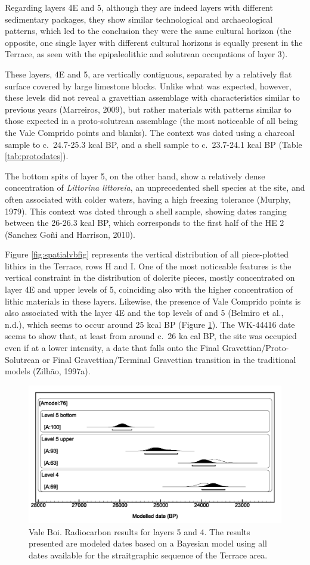 \documentclass[12pt,twoside]{reedthesis}
\begin{document}
Regarding layers 4E and 5, although they are indeed layers with different sedimentary packages, they show similar technological and archaeological patterns, which led to the conclusion they were the same cultural horizon (the opposite, one single layer with different cultural horizons is equally present in the Terrace, as seen with the epipaleolithic and solutrean occupations of layer 3).

These layers, 4E and 5, are vertically contiguous, separated by a relatively flat surface covered by large limestone blocks. Unlike what was expected, however, these levels did not reveal a gravettian assemblage with characteristics similar to previous years (Marreiros, 2009), but rather materials with patterns similar to those expected in a proto-solutrean assemblage (the most noticeable of all being the Vale Comprido points and blanks). The context was dated using a charcoal sample to c.~24.7-25.3 kcal BP, and a shell sample to c.~23.7-24.1 kcal BP (Table \ref{tab:protodates}).

The bottom spits of layer 5, on the other hand, show a relatively dense concentration of \emph{Littorina littoreia}, an unprecedented shell species at the site, and often associated with colder waters, having a high freezing tolerance (Murphy, 1979). This context was dated through a shell sample, showing dates ranging between the 26-26.3 kcal BP, which corresponds to the first half of the HE 2 (Sanchez Goñi and Harrison, 2010).

Figure \ref{fig:spatialvbfig} represents the vertical distribution of all piece-plotted lithics in the Terrace, rows H and I. One of the most noticeable features is the vertical constraint in the distribution of dolerite pieces, mostly concentrated on layer 4E and upper levels of 5, coinciding also with the higher concentration of lithic materials in these layers. Likewise, the presence of Vale Comprido points is also associated with the layer 4E and the top levels of and 5 (Belmiro et al., n.d.), which seems to occur around 25 kcal BP (Figure \ref{fig:c14VB}). The WK-44416 date seems to show that, at least from around c.~26 ka cal BP, the site was occupied even if at a lower intensity, a date that falls onto the Final Gravettian/Proto-Solutrean or Final Gravettian/Terminal Gravettian transition in the traditional models (Zilhão, 1997a).
\begin{figure}

{\centering \includegraphics[width=0.6\linewidth]{figure/c14_VB} 

}

\caption{Vale Boi. Radiocarbon results for layers 5 and 4. The results presented are modeled dates based on a Bayesian model using all dates available for the straitgraphic sequence of the Terrace area.}\label{fig:c14VB}
\end{figure}
~
\end{document}
